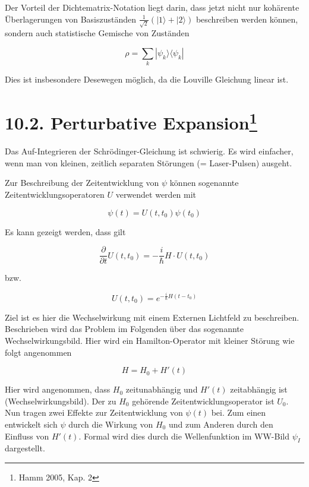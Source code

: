 Der Vorteil der Dichtematrix-Notation liegt darin, dass jetzt nicht nur kohärente Überlagerungen von Basiszuständen $\frac{1}{\sqrt{2}}(|1\rangle + |2\rangle)$ beschreiben werden können, sondern auch statistische Gemische von Zuständen 

\begin{equation}
    \rho = \sum_k|\psi_k\rangle\langle\psi_k|
\end{equation}

Dies ist insbesondere Desewegen möglich, da die Louville Gleichung linear ist. 

\section{10.2. Perturbative Expansion\protect\footnote{Hamm 2005, Kap. 2}\hfill *}

Das Auf-Integrieren der Schrödinger-Gleichung ist schwierig.
Es wird einfacher, wenn man von kleinen, zeitlich separaten
Störungen (= Laser-Pulsen) ausgeht. 

Zur Beschreibung der Zeitentwicklung von $\psi$ können sogenannte Zeitentwicklungsoperatoren $U$ verwendet werden mit

\begin{equation}
    \psi(t) = U(t,t_0)\psi(t_0)
\end{equation}

Es kann gezeigt werden, dass gilt

\begin{equation}
    \frac{\partial}{\partial t}U(t,t_0) = -\frac{i}{\hbar}H\cdot U(t,t_0)
\end{equation}

bzw.

\begin{equation}
    U(t,t_0) = e^{-\frac{i}{\hbar}H(t-t_0)}
\end{equation}

Ziel ist es hier die Wechselwirkung mit einem Externen Lichtfeld zu beschreiben. Beschrieben wird das Problem im Folgenden über das sogenannte Wechselwirkungsbild. Hier wird ein Hamilton-Operator mit kleiner Störung wie folgt angenommen

\begin{equation}
    H = H_0 + H'(t)
\end{equation}

Hier wird angenommen, dass $H_0$ zeitunabhängig und $H'(t)$ zeitabhängig ist (Wechselwirkungsbild). Der zu $H_0$ gehörende Zeitentwicklungsoperator ist $U_0$. Nun tragen zwei Effekte zur Zeitentwicklung von $\psi(t)$ bei. Zum einen entwickelt sich $\psi$ durch die Wirkung von $H_0$ und zum Anderen durch den Einfluss von $H'(t)$. Formal wird dies durch die Wellenfunktion im WW-Bild $\psi_I$ dargestellt. 

